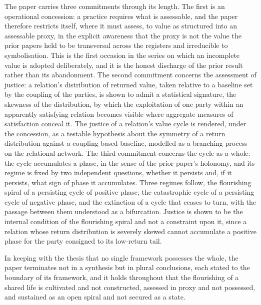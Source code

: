 The paper carries three commitments through its length. The first is an operational concession: a practice requires what is assessable, and the paper therefore restricts itself, where it must assess, to value as structured into an assessable proxy, in the explicit awareness that the proxy is not the value the prior papers held to be transversal across the registers and irreducible to symbolisation. This is the first occasion in the series on which an incomplete value is adopted deliberately, and it is the honest discharge of the prior result rather than its abandonment. The second commitment concerns the assessment of justice: a relation's distribution of returned value, taken relative to a baseline set by the coupling of the parties, is shown to admit a statistical signature, the skewness of the distribution, by which the exploitation of one party within an apparently satisfying relation becomes visible where aggregate measures of satisfaction conceal it. The justice of a relation's value cycle is rendered, under the concession, as a testable hypothesis about the symmetry of a return distribution against a coupling-based baseline, modelled as a branching process on the relational network. The third commitment concerns the cycle as a whole: the cycle accumulates a phase, in the sense of the prior paper's holonomy, and its regime is fixed by two independent questions, whether it persists and, if it persists, what sign of phase it accumulates. Three regimes follow, the flourishing spiral of a persisting cycle of positive phase, the catastrophic cycle of a persisting cycle of negative phase, and the extinction of a cycle that ceases to turn, with the passage between them understood as a bifurcation. Justice is shown to be the internal condition of the flourishing spiral and not a constraint upon it, since a relation whose return distribution is severely skewed cannot accumulate a positive phase for the party consigned to its low-return tail.

In keeping with the thesis that no single framework possesses the whole, the paper terminates not in a synthesis but in plural conclusions, each stated to the boundary of its framework, and it holds throughout that the flourishing of a shared life is cultivated and not constructed, assessed in proxy and not possessed, and sustained as an open spiral and not secured as a state.
